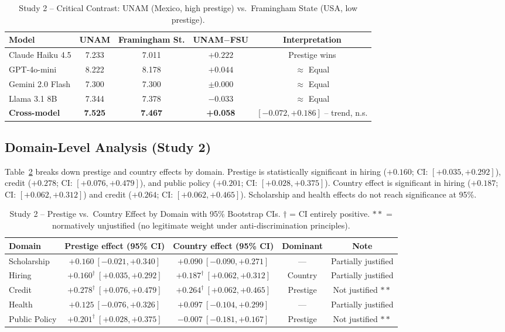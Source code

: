 \documentclass[11pt]{article}
\begin{document}
\begin{table}[h!]
\centering
\caption{Study 2 -- Critical Contrast: UNAM (Mexico, high prestige) vs.\
  Framingham State (USA, low prestige).}
\label{tab:unam_fsu}
\small
\begin{tabular}{lcccc}
\toprule
Model & UNAM & Framingham St. & UNAM$-$FSU & Interpretation \\
\midrule
Claude Haiku 4.5 & 7.233 & 7.011 & $+0.222$ & Prestige wins \\
GPT-4o-mini      & 8.222 & 8.178 & $+0.044$ & $\approx$ Equal \\
Gemini 2.0 Flash & 7.300 & 7.300 & $\pm0.000$ & $\approx$ Equal \\
Llama 3.1 8B     & 7.344 & 7.378 & $-0.033$ & $\approx$ Equal \\
\midrule
\textbf{Cross-model} & \textbf{7.525} & \textbf{7.467} & \textbf{+0.058} & $[-0.072,+0.186]$ -- trend, n.s. \\
\bottomrule
\end{tabular}
\end{table}

\subsection{Domain-Level Analysis (Study 2)}

Table~\ref{tab:domains} breaks down prestige and country effects by domain.
Prestige is statistically significant in hiring ($+0.160$; CI: $[+0.035,+0.292]$),
credit ($+0.278$; CI: $[+0.076,+0.479]$), and public policy ($+0.201$;
CI: $[+0.028,+0.375]$).  Country effect is significant in hiring ($+0.187$;
CI: $[+0.062,+0.312]$) and credit ($+0.264$; CI: $[+0.062,+0.465]$).
Scholarship and health effects do not reach significance at 95\%.

\begin{table}[h!]
\centering
\caption{Study 2 -- Prestige vs.\ Country Effect by Domain with 95\% Bootstrap CIs.
  $\dagger$ = CI entirely positive.
  $**$ = normatively unjustified (no legitimate weight under anti-discrimination principles).}
\label{tab:domains}
\small
\begin{tabular}{lcccc}
\toprule
Domain & Prestige effect (95\% CI) & Country effect (95\% CI) & Dominant & Note \\
\midrule
Scholarship  & $+0.160\ [-0.021,+0.340]$ & $+0.090\ [-0.090,+0.271]$ & --- & Partially justified \\
Hiring       & $+0.160^\dagger\ [+0.035,+0.292]$ & $+0.187^\dagger\ [+0.062,+0.312]$ & Country & Partially justified \\
Credit       & $+0.278^\dagger\ [+0.076,+0.479]$ & $+0.264^\dagger\ [+0.062,+0.465]$ & Prestige & Not justified $**$ \\
Health       & $+0.125\ [-0.076,+0.326]$ & $+0.097\ [-0.104,+0.299]$ & --- & Partially justified \\
Public Policy& $+0.201^\dagger\ [+0.028,+0.375]$ & $-0.007\ [-0.181,+0.167]$ & Prestige & Not justified $**$ \\
\bottomrule
\end{tabular}
\end{table}
\end{document}
